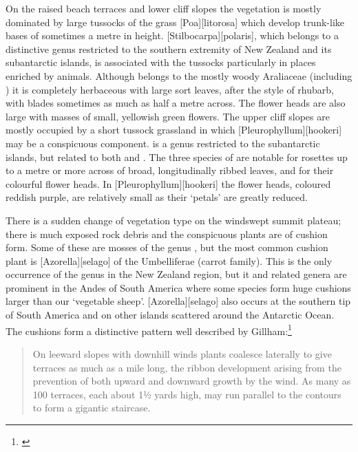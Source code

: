 On the raised beach terraces and lower cliff slopes the vegetation is mostly dominated by large tussocks of the grass [Poa][litorosa] which develop trunk-like bases of sometimes a metre in height. [Stilbocarpa][polaris], which belongs to a distinctive genus restricted to the southern extremity of New Zealand and its subantarctic islands, is associated with the tussocks particularly in places enriched by animals.
Although  belongs to the mostly woody Araliaceae (including ) it is completely herbaceous with large sort leaves, after the style of rhubarb, with blades sometimes as much as half a metre across.
The flower heads are also large with masses of small, yellowish green flowers.
The upper cliff slopes are mostly occupied by a short tussock grassland in which [Pleurophyllum][hookeri] may be a conspicuous component.  is a genus restricted to the subantarctic islands, but related to both  and .
The three species of  are notable for rosettes up to a metre or more across of broad, longitudinally ribbed leaves, and for their colourful flower heads.
In [Pleurophyllum][hookeri] the flower heads, coloured reddish purple, are relatively small as their `petals' are greatly reduced.

There is a sudden change of vegetation type on the windswept summit plateau; there is much exposed rock debris and the conspicuous plants are of cushion form.
Some of these are mosses of the genus , but the most common cushion plant is [Azorella][selago] of the Umbelliferae (carrot family).
This is the only occurrence of the genus in the New Zealand region, but it and related genera are prominent in the Andes of South America where some species form huge cushions larger than our `vegetable sheep'. [Azorella][selago] also occurs at the southern tip of South America and on other islands scattered around the Antarctic Ocean.
The  cushions form a distinctive pattern well described by Gillham:\footnote{\cite{gillham1967sub}}

\begin{quote}
	On leeward slopes with downhill winds  plants coalesce laterally to give terraces as much as a mile long, the ribbon development arising from the prevention of both upward and downward growth by the wind.
	As many as 100 terraces, each about 1½ yards high, may run parallel to the contours to form a gigantic staircase.
\end{quote}

